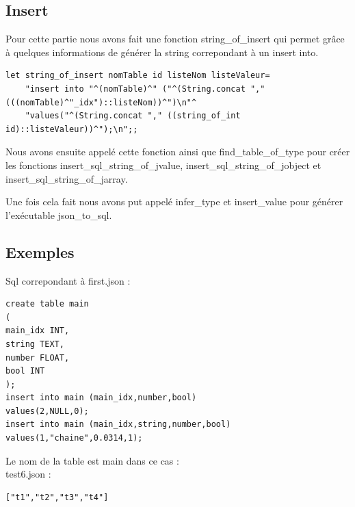 \documentclass{report}
\begin{document}
\subsection{Insert}
\par
Pour cette partie nous avons fait une fonction string\_of\_insert qui permet grâce à quelques informations de générer la string correpondant à un insert into.
\\
\begin{verbatim}
let string_of_insert nomTable id listeNom listeValeur=
	"insert into "^(nomTable)^" ("^(String.concat "," (((nomTable)^"_idx")::listeNom))^")\n"^
	"values("^(String.concat "," ((string_of_int id)::listeValeur))^");\n";;
\end{verbatim}
Nous avons ensuite appelé cette fonction ainsi que find\_table\_of\_type pour créer les fonctions insert\_sql\_string\_of\_jvalue, insert\_sql\_string\_of\_jobject et insert\_sql\_string\_of\_jarray.
\par
Une fois cela fait nous avons put appelé infer\_type et insert\_value pour générer l'exécutable json\_to\_sql.
\subsection{Exemples}
Sql correpondant à first.json :
\\
\begin{verbatim}
create table main
(
main_idx INT,
string TEXT,
number FLOAT,
bool INT
);
insert into main (main_idx,number,bool)
values(2,NULL,0);
insert into main (main_idx,string,number,bool)
values(1,"chaine",0.0314,1);
\end{verbatim}

Le nom de la table est main dans ce cas :\\
test6.json :
\\
\begin{verbatim}
["t1","t2","t3","t4"]
\end{verbatim}
\end{document}
